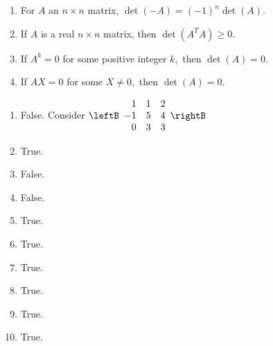 \begin{enumialphparenastyle}
\begin{ex}
\begin{enumerate}
\item For $A$ an $n\times n$ matrix, $\det \left( -A\right) =\left(
-1\right) ^{n}\det \left( A\right) .$

\item If $A$ is a real $n\times n$ matrix, then $\det \left( A^{T}A\right)
\geq 0.$

\item If $A^{k}=0$ for some positive integer $k,$ then $\det \left(
A\right) =0.$

\item If $AX=0$ for some $X \neq 0,$ then $\det \left(
A\right) =0.$
\end{enumerate}
\begin{sol}
\begin{enumerate}
\item False. Consider $\leftB
\begin{array}{rrr}
1 & 1 & 2 \\
-1 & 5 & 4 \\
0 & 3 & 3
\end{array}
\rightB $
\item True.
\item False.
\item False.
\item True.
\item True.
\item True.
\item True.
\item True.
\item True.
\end{enumerate}
\end{sol}
\end{ex}

\end{enumialphparenastyle}
